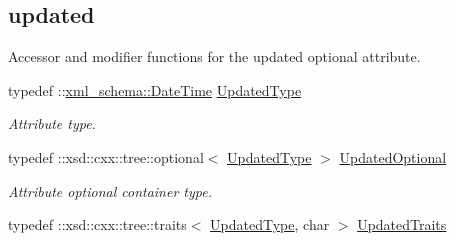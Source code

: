 \subsection*{updated}
\label{_amgrp0f81d52e06caaa4860887488d18271c7}
Accessor and modifier functions for the updated optional attribute. \begin{DoxyCompactItemize}
\item 
\hypertarget{classopenstack_1_1xml_1_1Image_aa24ab3c61a5b2ca0b4a715ce25689491}{
typedef ::\hyperlink{namespacexml__schema_ac157d7debe19af40c06ef2330429a088}{xml\_\-schema::DateTime} \hyperlink{classopenstack_1_1xml_1_1Image_aa24ab3c61a5b2ca0b4a715ce25689491}{UpdatedType}}
\label{classopenstack_1_1xml_1_1Image_aa24ab3c61a5b2ca0b4a715ce25689491}

\begin{DoxyCompactList}\small\item\em Attribute type. \item\end{DoxyCompactList}\item 
\hypertarget{classopenstack_1_1xml_1_1Image_a21b65ba75912c63ba7bc5718fa2df9d2}{
typedef ::xsd::cxx::tree::optional$<$ \hyperlink{classopenstack_1_1xml_1_1Image_aa24ab3c61a5b2ca0b4a715ce25689491}{UpdatedType} $>$ \hyperlink{classopenstack_1_1xml_1_1Image_a21b65ba75912c63ba7bc5718fa2df9d2}{UpdatedOptional}}
\label{classopenstack_1_1xml_1_1Image_a21b65ba75912c63ba7bc5718fa2df9d2}

\begin{DoxyCompactList}\small\item\em Attribute optional container type. \item\end{DoxyCompactList}\item 
\hypertarget{classopenstack_1_1xml_1_1Image_a4497aad89cbbd14c328992a1491c8e40}{
typedef ::xsd::cxx::tree::traits$<$ \hyperlink{classopenstack_1_1xml_1_1Image_aa24ab3c61a5b2ca0b4a715ce25689491}{UpdatedType}, char $>$ \hyperlink{classopenstack_1_1xml_1_1Image_a4497aad89cbbd14c328992a1491c8e40}{UpdatedTraits}}
\label{classopenstack_1_1xml_1_1Image_a4497aad89cbbd14c328992a1491c8e40}


\end{DoxyCompactItemize}
